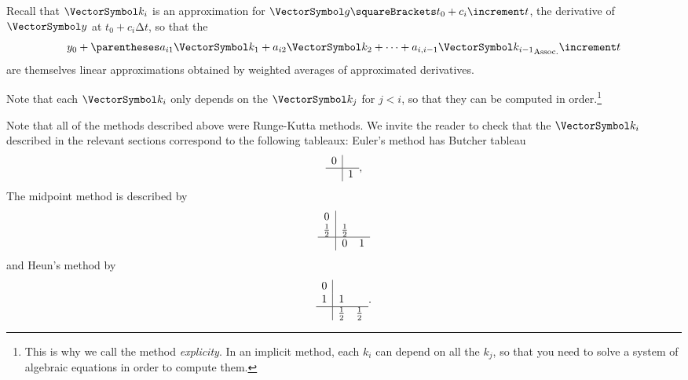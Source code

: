 \documentclass[10pt, a4paper, twoside]{basestyle}
\begin{document}
Recall that $\vk_i$ is an approximation for $\vg\of{t_0 + c_i\increment t}$, the derivative of $\vy$ at $t_0 + c_i\increment t$, so that the\[
y_0 + \pa{a_{i1}\vk_1 + a_{i2}\vk_2 + \dotsb + a_{i,i-1}\vk_{i-1}} \increment t
\] are themselves linear approximations obtained by weighted averages of approximated derivatives.

Note that each $\vk_i$ only depends on the $\vk_j$ for $j<i$, so that they can be computed in order.\footnote{This is why we call the method \emph{explicity}. In an implicit method, each $k_i$ can depend on all the $k_j$, so that you need to solve a system of algebraic equations in order to compute them.}

Note that all of the methods described above were Runge-Kutta methods. We invite the reader to check that the $\vk_i$ described in the relevant sections correspond to the following tableaux:
Euler's method has Butcher tableau\[
\begin{array}{c | c}
0    &    \\
\hline
     &  1  
\end{array}\text,
\]
The midpoint method is described by\[
\begin{array}{c | c c}
0           &                \\
\frac 1 2   &  \frac 1 2   & \\
\hline
            &  0           & 1  
\end{array}
\]
and Heun's method by\[
\begin{array}{c | c c}
0           &                \\
1           &  1           & \\
\hline
            &  \frac 1 2   & \frac 1 2
\end{array}\text.
\]
\end{document}
